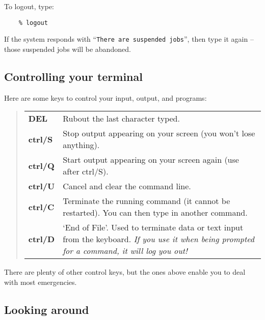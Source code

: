 \documentclass[twoside,11pt]{article}
\begin{document}
To logout, type:
\begin{verbatim}
    % logout
\end{verbatim}
If the system responds with ``{\tt There are suspended jobs}'', then type it
again -- those suspended jobs will be abandoned.

\subsection{Controlling your terminal}

Here are some keys to control your input, output, and programs:

\begin{quote}
\begin{tabular}{lp{72mm}}

{\bf DEL} & Rubout the last character typed.\\
{\bf  ctrl/S} & Stop output appearing on your screen (you won't lose
  anything).\\
{\bf  ctrl/Q} & Start output appearing on your screen again (use after
  ctrl/S).\\
{\bf  ctrl/U} & Cancel and clear the command line.\\
{\bf  ctrl/C} & Terminate the running command (it cannot be restarted).
  You can then type in another command.\\
{\bf  ctrl/D} & `End of File'. Used to terminate data or text input from
  the keyboard. {\em If you use it when being prompted for a command, it will
  log you out!}
\end{tabular}
\end{quote}
There are plenty of other control keys, but the ones above enable you to deal
with most emergencies.

\subsection{Looking around}
\end{document}
